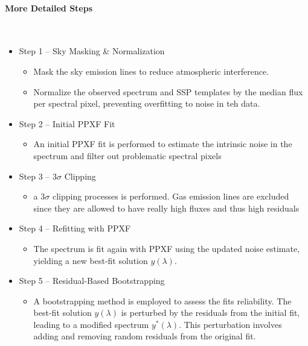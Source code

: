 \documentclass[svgnames]{article}     %
\begin{document}
\paragraph{More Detailed Steps} \mbox{} \\

\begin{itemize}
  \item Step 1 -- Sky Masking \& Normalization
    \begin{itemize}
      \item Mask the sky emission lines to reduce atmospheric interference.
      \item Normalize the observed spectrum and SSP templates by the median
        flux per  spectral pixel, preventing overfitting to noise in teh data. 
    \end{itemize}
  \item Step 2 -- Initial PPXF Fit
    \begin{itemize}
      \item An initial PPXF fit is performed to estimate the intrinsic noise in
        the spectrum and filter out problematic spectral pixels 
    \end{itemize}
  \item Step 3 -- $3\sigma$ Clipping
    \begin{itemize}
      \item a $3\sigma$ clipping processes is performed. Gas emission lines are
        excluded since they are allowed to have really high fluxes and thus
        high residuals 
    \end{itemize}
  \item Step 4 -- Refitting with PPXF
    \begin{itemize}
      \item The spectrum is fit again with PPXF using the updated noise
        estimate, yielding a new best-fit solution $y(\lambda)$. 
    \end{itemize}
  \item Step 5 -- Residual-Based Bootstrapping
    \begin{itemize}
      \item A bootstrapping method is employed to assess the fits reliability.
        The best-fit solution $y(\lambda)$ is perturbed by the residuals from
        the initial fit, leading to a modified spectrum $y^*(\lambda)$. This
        perturbation involves adding and removing random residuals from the
        original fit. 
    \end{itemize}

\end{itemize}
\end{document}
